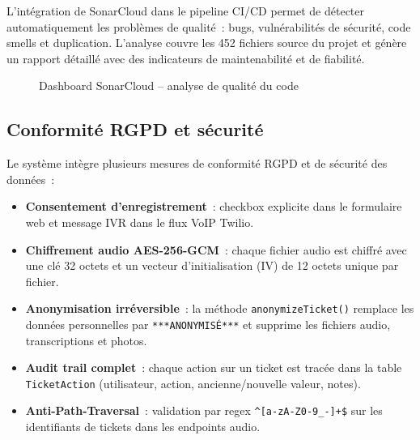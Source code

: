 L'int\'{e}gration de SonarCloud dans le pipeline CI/CD permet de d\'{e}tecter automatiquement les probl\`{e}mes de qualit\'{e}~: bugs, vuln\'{e}rabilit\'{e}s de s\'{e}curit\'{e}, code smells et duplication. L'analyse couvre les 452 fichiers source du projet et g\'{e}n\`{e}re un rapport d\'{e}taill\'{e} avec des indicateurs de maintenabilit\'{e} et de fiabilit\'{e}.

\begin{figure}[H]
    \centering
    \caption{Dashboard SonarCloud -- analyse de qualit\'{e} du code}
    \label{fig:sonar}
\end{figure}

\subsection{Conformit\'{e} RGPD et s\'{e}curit\'{e}}

Le syst\`{e}me int\`{e}gre plusieurs mesures de conformit\'{e} RGPD et de s\'{e}curit\'{e} des donn\'{e}es~:

\begin{itemize}
    \item \textbf{Consentement d'enregistrement}~: checkbox explicite dans le formulaire web et message IVR dans le flux VoIP Twilio.
    \item \textbf{Chiffrement audio AES-256-GCM}~: chaque fichier audio est chiffr\'{e} avec une cl\'{e} 32 octets et un vecteur d'initialisation (IV) de 12 octets unique par fichier.
    \item \textbf{Anonymisation irr\'{e}versible}~: la m\'{e}thode \texttt{anonymizeTicket()} remplace les donn\'{e}es personnelles par \texttt{***ANONYMIS\'{E}***} et supprime les fichiers audio, transcriptions et photos.
    \item \textbf{Audit trail complet}~: chaque action sur un ticket est trac\'{e}e dans la table \texttt{TicketAction} (utilisateur, action, ancienne/nouvelle valeur, notes).
    \item \textbf{Anti-Path-Traversal}~: validation par regex \texttt{\^{}[a-zA-Z0-9\_-]+\$} sur les identifiants de tickets dans les endpoints audio.
\end{itemize}


